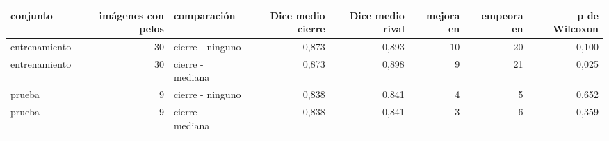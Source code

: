 \begin{tabular}{lrlrrrrr}
\toprule
conjunto & imágenes con pelos & comparación & Dice medio cierre & Dice medio rival & mejora en & empeora en & p de Wilcoxon \\
\midrule
entrenamiento & 30 & cierre - ninguno & 0{,}873 & 0{,}893 & 10 & 20 & 0{,}100 \\
entrenamiento & 30 & cierre - mediana & 0{,}873 & 0{,}898 & 9 & 21 & 0{,}025 \\
prueba & 9 & cierre - ninguno & 0{,}838 & 0{,}841 & 4 & 5 & 0{,}652 \\
prueba & 9 & cierre - mediana & 0{,}838 & 0{,}841 & 3 & 6 & 0{,}359 \\
\bottomrule
\end{tabular}
